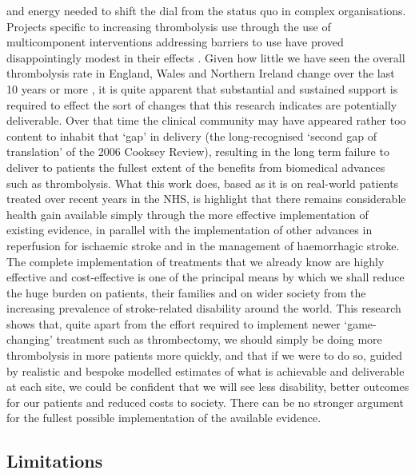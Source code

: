 and energy needed to shift the dial from the status quo in complex organisations. Projects specific to increasing thrombolysis use through the use of multicomponent interventions addressing barriers to use have proved disappointingly modest in their effects  \cite{scott_multilevel_2013}. Given how little we have seen the overall thrombolysis rate in England, Wales and Northern Ireland change over the last 10 years or more \cite{sentinel_national_stroke_audit_programme_ssnap_2023}, it is quite apparent that substantial and sustained support is required to effect the sort of changes that this research indicates are potentially deliverable. Over that time the clinical community may have appeared rather too content to inhabit that ‘gap’ in delivery (the long-recognised ‘second gap of translation’ of the 2006 Cooksey Review\cite{cooksey_review_2006}), resulting in the long term failure to deliver to patients the fullest extent of the benefits from biomedical advances such as thrombolysis. What this work does, based as it is on real-world patients treated over recent years in the NHS, is highlight that there remains considerable health gain available simply through the more effective implementation of existing evidence, in parallel with the implementation of other advances in reperfusion for ischaemic stroke and in the management of haemorrhagic stroke. The complete implementation of treatments that we already know are highly effective and cost-effective is one of the principal means by which we shall reduce the huge burden on patients, their families and on wider society from the increasing prevalence of stroke-related disability around the world. This research shows that, quite apart from the effort required to implement newer ‘game-changing’ treatment such as thrombectomy, we should simply be doing more thrombolysis in more patients more quickly, and that if we were to do so, guided by realistic and bespoke modelled estimates of what is achievable and deliverable at each site, we could be confident that we will see less disability, better outcomes for our patients and reduced costs to society. There can be no stronger argument for the fullest possible implementation of the available evidence.

\subsection{Limitations}

